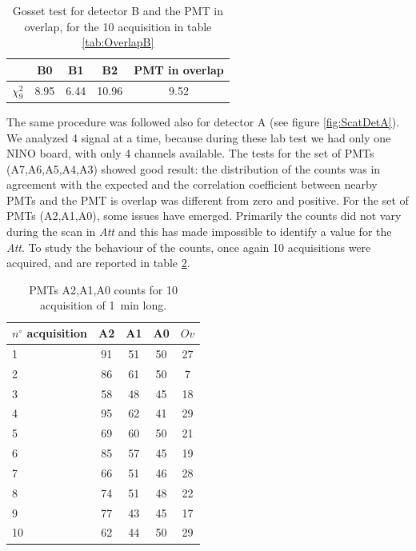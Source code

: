 \begingroup
\setlength{\tabcolsep}{8pt} %
\renewcommand{\arraystretch}{1.2} %
\begin{table}[ht]
\centering
\begin{tabular}{c|c|c|c|c}
\hline 
   & B0 & B1 & B2 & PMT in overlap \\ 
\hline
$\chi^{2}_{9}$ & 8.95 & 6.44 & 10.96 & 9.52\\ 
\hline
\end{tabular}
\caption{Gosset test for detector B and the PMT in overlap, for the 10 acquisition in table \ref{tab:OverlapB}}
\label{tab:GossetForOver}
\end{table}
\endgroup

The same procedure was followed also for detector A (see figure \ref{fig:ScatDetA}). We analyzed 4 signal at a time, because during these lab test we had only one NINO board, with only 4 channels available. The tests for the set of PMTs (A7,A6,A5,A4,A3) showed good result: the distribution of the counts was in agreement with the expected and the correlation coefficient between nearby PMTs and the PMT is overlap was different from zero and positive. For the set of PMTs (A2,A1,A0), some issues have emerged. Primarily the counts did not vary during the scan in \textit{Att} and this has made impossible to identify a value for the \textit{Att}. To study the behaviour of the counts, once again 10 acquisitions were acquired, and are reported in table \ref{tab:PmtAproblem}. \newpage

\begin{table}[htb]
\centering
\begin{tabular}{lcccc}
\hline 
$n^{\circ}$ acquisition & A2 & A1 & A0 & $Ov$ \\ 
\hline 
1 & 91 & 51 & 50 & 27 \\ 
 
2 & 86 & 61 & 50 & 7 \\ 
 
3 & 58 & 48 & 45 & 18 \\ 
 
4 & 95 & 62 & 41 & 29 \\ 
 
5 & 69 & 60 & 50 & 21 \\ 
 
6 & 85 & 57 & 45 & 19 \\ 
 
7 & 66 & 51 & 46 & 28 \\ 
 
8 & 74 & 51 & 48 & 22 \\ 
 
9 & 77 & 43 & 45 & 17 \\ 
 
10 & 62 & 44 & 50 & 29 \\ 
\hline 
\end{tabular}
\caption{PMTs A2,A1,A0 counts for 10 acquisition of \SI{1}{\minute} long.}
\label{tab:PmtAproblem}
\end{table}

